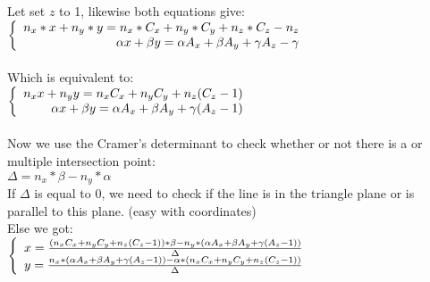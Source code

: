 \documentclass{article}
\begin{document}
    
    Let set $z$ to 1, likewise both equations give:\\
    $\left\{\begin{array}{r c l}
    	    n_x * x + n_y * y = n_x * C_x + n_y * C_y + n_z * C_z - n_z\\
    	    \alpha x + \beta y = \alpha A_x + \beta A_y + \gamma A_z - \gamma
    \end{array}\right.$\\\\
    
    Which is equivalent to:\\
    $\left\{\begin{array}{r c l}
    	    n_x x + n_y y = n_x C_x + n_y C_y + n_z (C_z - 1)\\
    	    \alpha x + \beta y = \alpha A_x + \beta A_y + \gamma (A_z - 1)
    \end{array}\right.$\\\\
    
    Now we use the Cramer's determinant to check whether or not there is a or multiple intersection point:\\
    $\Delta = n_x * \beta - n_y * \alpha$\\
    If $\Delta$ is equal to 0, we need to check if the line is in the triangle plane or is parallel to this plane. (easy with coordinates)\\
    Else we got:\\
    $\left\{\begin{array}{r c l}
    	    x = \frac{(n_x C_x + n_y C_y + n_z (C_z - 1)) * \beta - n_y * (\alpha A_x + \beta A_y + \gamma (A_z - 1))}{\Delta}\\
    	    y = \frac{n_x * (\alpha A_x + \beta A_y + \gamma (A_z - 1)) - \alpha * (n_x C_x + n_y C_y + n_z (C_z - 1))}{\Delta}
    \end{array}\right.$\\\\
    
\end{document}

